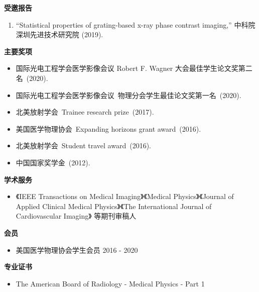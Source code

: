 \documentclass[letterpaper,11pt]{article}
\newcommand{\resheading}[1]{{\large \colorbox{mygrey}{\begin{minipage}{\textwidth}{\textbf{#1 \vphantom{p\^{E}}}}\end{minipage}}}}
\begin{document}
\begin{CJK}{UTF8}{song}
\resheading {受邀报告}
\begin{enumerate}\justifying
\item ``Statistical properties of grating-based x-ray phase contrast imaging,'' 中科院深圳先进技术研究院 (2019).
\end{enumerate}
\resheading{主要奖项}
\begin{itemize}\justifying
\item 国际光电工程学会医学影像会议 Robert F. Wagner 大会最佳学生论文奖第二名~(2020).
\item 国际光电工程学会医学影像会议~物理分会学生最佳论文奖第一名~(2020).
\item 北美放射学会~Trainee research prize~(2017).
\item 美国医学物理协会~Expanding horizons grant award~(2016).
\item 北美放射学会~Student travel award~(2016).
\item 中国国家奖学金~(2012).
\end{itemize}
\resheading{学术服务}
\begin{itemize}
\item 《IEEE Transactions on Medical Imaging》《Medical Physics》《Journal of Applied Clinical Medical Physics》《The International Journal of Cardiovascular Imaging》 等期刊审稿人
\end{itemize}
\resheading{会员}
\begin{itemize}
\item 美国医学物理协会学生会员 \cftdotfill{\cftdotsep} 2016 - 2020
\end{itemize}
\resheading{专业证书}
\begin{itemize}
\item The American Board of Radiology - Medical Physics - Part 1
\end{itemize}
\end{CJK}
\end{document}
